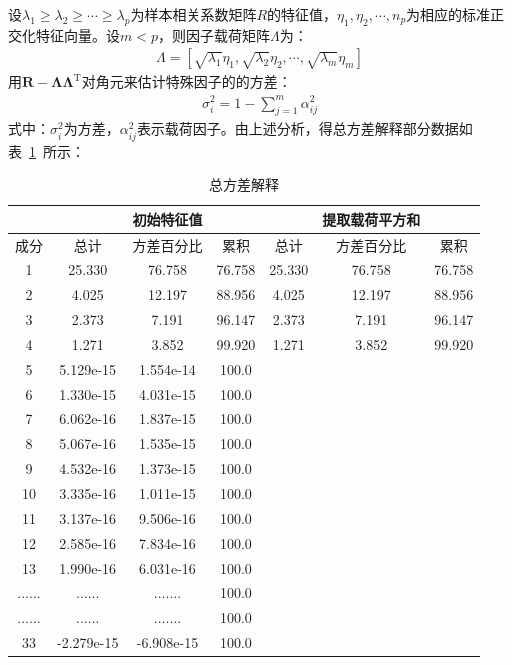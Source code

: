 \documentclass{whutmod}
\begin{document}
	设$\lambda_{1} \geqslant \lambda_{2} \geqslant \cdots \geqslant \lambda_{p}$为样本相关系数矩阵$R$的特征值，$\eta _ { 1 } , \eta _ { 2 } , \cdots , n _ { p }$为相应的标准正交化特征向量。设$m<p$，则因子载荷矩阵$\Lambda$为：
	\begin{gather}
	\Lambda=\left[\sqrt{\lambda_{1}} \eta_{1}, \sqrt{\lambda_{2}} \eta_{2}, \cdots, \sqrt{\lambda_{m}} \eta_{m}\right]
	\end{gather}
    用$\boldsymbol{R}-\boldsymbol{\Lambda} \boldsymbol{\Lambda}^{\mathrm{T}}$对角元来估计特殊因子的的方差：
	\begin{gather}
	\sigma_{i}^{2}=1-\sum_{j=1}^{m} \alpha_{i j}^{2}
	\end{gather}
	式中：$\sigma_{i}^{2}$为方差，$\alpha_{i j}^{2}$表示载荷因子。由上述分析，得总方差解释部分数据如表~\ref{biaosan}~所示：	
		\begin{table}[H]
		\centering
		\caption{总方差解释}\label{biaosan}
		\begin{tabular}{ccccccc}
			\toprule[1.5pt]
		\multicolumn{1}{m{1cm}}{\centering } &
				\multicolumn{1}{m{1.5cm}}{\centering  } &
		 \multicolumn{1}{m{3cm}}{\centering 初始特征值} &
		 		\multicolumn{1}{m{1cm}|}{\centering  } &
		\multicolumn{1}{m{1cm}}{\centering  } &
		 \multicolumn{1}{m{3cm}}{\centering 提取载荷平方和}&
		 		\multicolumn{1}{m{1.5cm}}{\centering  } \\\hline
		\multicolumn{1}{m{1cm}|}{\centering  成分} &
		\multicolumn{1}{m{1.5cm}}{\centering  总计} &
		\multicolumn{1}{m{3cm}}{\centering  方差百分比} &
		\multicolumn{1}{m{1cm}|}{\centering  累积} &
		\multicolumn{1}{m{1cm}}{\centering  总计} &
		\multicolumn{1}{m{3cm}}{\centering  方差百分比} &				\multicolumn{1}{m{1.5cm}}{\centering  累积} \\

			\midrule[1pt]
			1&25.330&76.758&76.758&25.330&76.758&76.758 \\
			2&4.025&12.197&88.956&4.025&12.197&88.956 \\
			3&2.373&7.191&96.147&2.373&7.191&96.147 \\
			4&1.271&3.852&99.920&1.271&3.852&99.920 \\
			5&5.129e-15&1.554e-14&100.0&&& \\
			6&1.330e-15&4.031e-15&100.0&&& \\
			7&6.062e-16&1.837e-15&100.0&&& \\
			8&5.067e-16&1.535e-15&100.0&&& \\
			9&4.532e-16&1.373e-15&100.0&&& \\
			10&3.335e-16&1.011e-15&100.0&&& \\
			11&3.137e-16&9.506e-16&100.0&&& \\
			12&2.585e-16&7.834e-16&100.0&&& \\
			13&1.990e-16&6.031e-16&100.0&&& \\
			......&......&.......&100.0&&& \\
			......&......&.......&100.0&&& \\
			33&-2.279e-15&-6.908e-15&100.0&&& \\
			\bottomrule[1.5pt]
		\end{tabular}
	\end{table}
	
\end{document}
